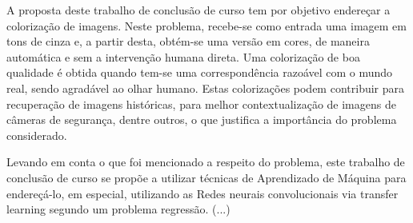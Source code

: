 \begin{comment}
A proposta deste trabalho de conclusão de curso apresenta os procedimentos necessários para endereçar o problema de colorização de imagens utilizando as técnicas de \emph{Deep Learning}. Este problema consiste em obter a coloração de imagens em tons de cinza por meio de transferência de conhecimento utilizando redes neurais convolucionais pré-treinadas e adaptadas a este cenário. 
	content...
\end{comment}

A proposta deste trabalho de conclusão de curso tem por objetivo endereçar a colorização de imagens. Neste problema, recebe-se como entrada uma imagem em tons de cinza e, a partir desta, obtém-se uma versão em cores, de maneira automática e sem a intervenção humana direta. Uma colorização de boa qualidade é obtida quando tem-se uma correspondência razoável com o mundo real, sendo agradável ao olhar humano. Estas colorizações podem contribuir para recuperação de  imagens históricas, para melhor contextualização de imagens de câmeras de segurança, dentre outros, o que justifica  a importância  do problema considerado.

Levando em conta o que foi mencionado a respeito do problema, este trabalho de conclusão de curso se propõe a utilizar técnicas de Aprendizado de Máquina para endereçá-lo, em especial, utilizando as  Redes neurais convolucionais via transfer learning segundo um problema regressão. (...)